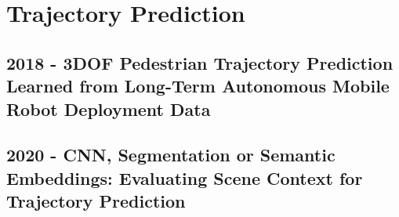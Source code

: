 \section{Trajectory Prediction}\label{sec: traj prediction}

\subsection*{2018 - 3DOF Pedestrian Trajectory Prediction Learned from Long-Term Autonomous Mobile Robot Deployment Data}

\cite{sun20183dof}

\subsection*{2020 - CNN, Segmentation or Semantic Embeddings: Evaluating Scene Context for Trajectory Prediction}

\cite{syed2020cnn}